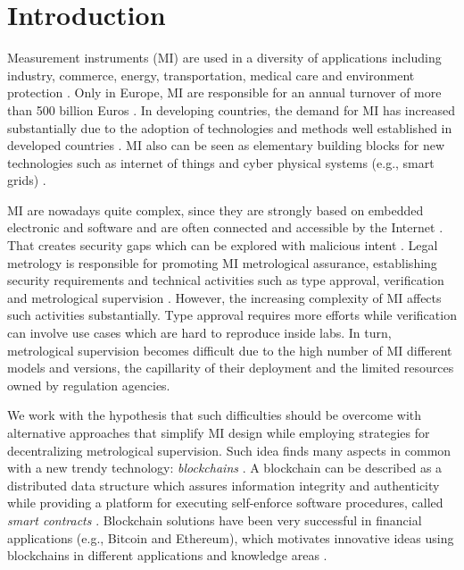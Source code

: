 \documentclass[journal]{IEEEtran}
\begin{document}


%
\IEEEpeerreviewmaketitle

\section{Introduction}
Measurement instruments (MI) are used in a diversity of applications including industry, commerce, energy, transportation, medical care and environment protection \cite{RodriguesFilho2015}. Only in Europe, MI are responsible for an annual turnover of more than 500 billion Euros \cite{Esche2015}. In developing countries, the demand for MI has increased substantially due to the adoption of technologies and methods well established in developed countries \cite{RodriguesFilho2015}. MI also can be seen as elementary building blocks for new technologies such as internet of things and cyber physical systems (e.g., smart grids) \cite{RodriguesFilho2015,Esche2015,Camara2012,Boccardo2014,Peters2015,Oppermann2016}. 

MI are nowadays quite complex, since they are strongly based on embedded electronic and software and are often connected and accessible by the Internet \cite{Esche2015,Camara2012}. That creates security gaps which can be explored with malicious intent \cite{Boccardo2014,Peters2015}. Legal metrology is responsible for promoting MI metrological assurance, establishing security requirements and technical activities such as type approval, verification and metrological supervision \cite{RodriguesFilho2015}. However, the increasing complexity of MI affects such activities substantially. Type approval requires more efforts while verification can involve use cases which are hard to reproduce inside labs. In turn, metrological supervision becomes difficult due to the high number of MI different models and versions, the capillarity of their deployment and the limited resources owned by regulation agencies.

We work with the hypothesis that such difficulties should be overcome with alternative approaches that simplify MI design while employing strategies for decentralizing metrological supervision. Such idea finds many aspects in common with a new trendy technology: \emph{blockchains} \cite{Zheng2017}. A blockchain can be described as a distributed data structure which assures information integrity and authenticity while providing a platform for executing self-enforce software procedures, called \emph{smart contracts} \cite{Christidis2016}. Blockchain solutions have been very successful in financial applications (e.g., Bitcoin and Ethereum), which motivates innovative ideas using blockchains in different applications and knowledge areas \cite{Zheng2017,Christidis2016}.
\end{document}
